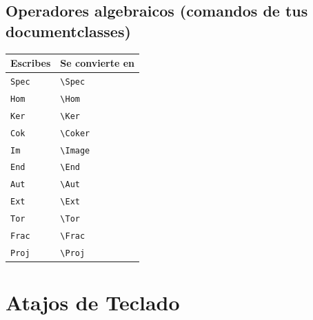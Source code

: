 \documentclass[11pt]{article}
\begin{document}
\subsection{Operadores algebraicos (comandos de tus documentclasses)}
\label{sec:orgfb8dd2b}
\begin{center}
\begin{tabular}{ll}
Escribes & Se convierte en\\
\hline
\texttt{Spec} & \texttt{\textbackslash{}Spec}\\
\texttt{Hom} & \texttt{\textbackslash{}Hom}\\
\texttt{Ker} & \texttt{\textbackslash{}Ker}\\
\texttt{Cok} & \texttt{\textbackslash{}Coker}\\
\texttt{Im} & \texttt{\textbackslash{}Image}\\
\texttt{End} & \texttt{\textbackslash{}End}\\
\texttt{Aut} & \texttt{\textbackslash{}Aut}\\
\texttt{Ext} & \texttt{\textbackslash{}Ext}\\
\texttt{Tor} & \texttt{\textbackslash{}Tor}\\
\texttt{Frac} & \texttt{\textbackslash{}Frac}\\
\texttt{Proj} & \texttt{\textbackslash{}Proj}\\
\end{tabular}
\end{center}
\section{Atajos de Teclado}
\label{sec:orgb3aa87d}
\end{document}

